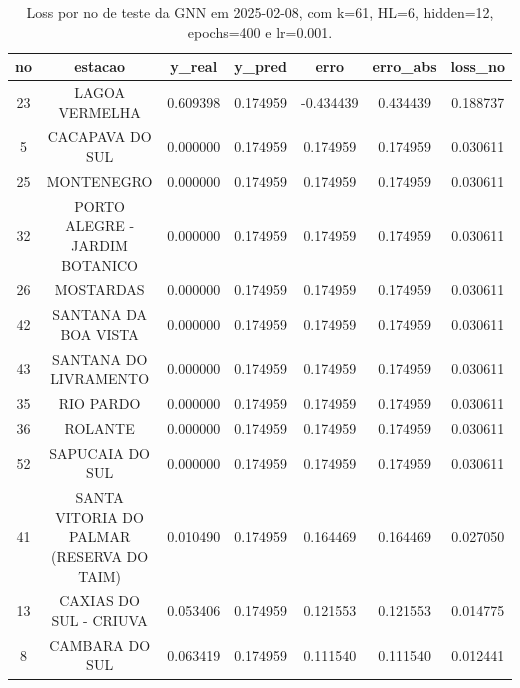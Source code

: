 \begin{table}[h]
\centering
\caption{Loss por no de teste da GNN em 2025-02-08, com k=61, HL=6, hidden=12, epochs=400 e lr=0.001.}
\label{tab:gnn_loss_k61_hl6_h12_e400_d20250208}
\begin{tabular}{ccccccc}
\toprule
no & estacao & y\_real & y\_pred & erro & erro\_abs & loss\_no \\
\midrule
23 & LAGOA VERMELHA & 0.609398 & 0.174959 & -0.434439 & 0.434439 & 0.188737 \\
5 & CACAPAVA DO SUL & 0.000000 & 0.174959 & 0.174959 & 0.174959 & 0.030611 \\
25 & MONTENEGRO & 0.000000 & 0.174959 & 0.174959 & 0.174959 & 0.030611 \\
32 & PORTO ALEGRE - JARDIM BOTANICO & 0.000000 & 0.174959 & 0.174959 & 0.174959 & 0.030611 \\
26 & MOSTARDAS & 0.000000 & 0.174959 & 0.174959 & 0.174959 & 0.030611 \\
42 & SANTANA DA BOA VISTA & 0.000000 & 0.174959 & 0.174959 & 0.174959 & 0.030611 \\
43 & SANTANA DO LIVRAMENTO & 0.000000 & 0.174959 & 0.174959 & 0.174959 & 0.030611 \\
35 & RIO PARDO & 0.000000 & 0.174959 & 0.174959 & 0.174959 & 0.030611 \\
36 & ROLANTE & 0.000000 & 0.174959 & 0.174959 & 0.174959 & 0.030611 \\
52 & SAPUCAIA DO SUL & 0.000000 & 0.174959 & 0.174959 & 0.174959 & 0.030611 \\
41 & SANTA VITORIA DO PALMAR (RESERVA DO TAIM) & 0.010490 & 0.174959 & 0.164469 & 0.164469 & 0.027050 \\
13 & CAXIAS DO SUL - CRIUVA & 0.053406 & 0.174959 & 0.121553 & 0.121553 & 0.014775 \\
8 & CAMBARA DO SUL & 0.063419 & 0.174959 & 0.111540 & 0.111540 & 0.012441 \\
\bottomrule
\end{tabular}
\end{table}
